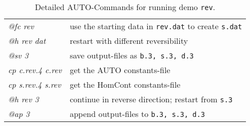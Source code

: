 \documentclass[12pt]{report}
\begin{document}
\begin{table}[htbp]
\begin{center}
\begin{tabular}{| l | l |}
  {\it @fc rev} & use the starting data in {\tt rev.dat} to create {\tt s.dat} \\ 
  {\it @h rev dat} & restart with different reversibility \\ 
  {\it @sv 3} & save output-files as {\tt b.3, s.3, d.3} \\ 
\hline
  {\it cp c.rev.4 c.rev} & get the AUTO constants-file \\ 
  {\it cp s.rev.4 s.rev} & get the HomCont constants-file \\ 
  {\it @h rev 3} & continue in reverse direction; restart from {\tt s.3} \\ 
  {\it @ap 3} & append output-files to {\tt b.3, s.3, d.3} \\ 
\hline
\end{tabular}
\caption{Detailed {\cal AUTO}-Commands for running demo {\tt rev}.}
\label{tbl:demo_rev_1}
\end{center}
\end{table}





 \label{sec:bibliography}
\end{document}
